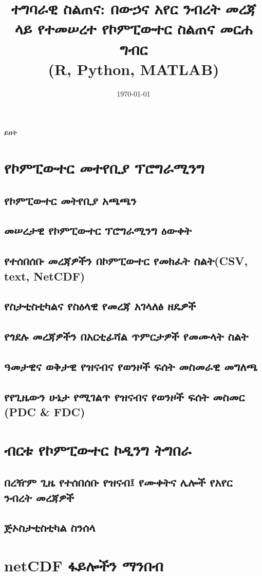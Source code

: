 \documentclass[t]{beamer}
\title[በማሞ ካሠኝ]{ተግባራዊ ስልጠና: በውኃና አየር ንብረት መረጃ ላይ የተመሠረተ የኮምፒውተር ስልጠና መርሐ ግብር \\ (R, Python, MATLAB)}
\author[በልሃ ልበልሻ የምርምር ተቋም]{በማሞ ካሠኝ \\ \url mamo.kassegn@aau.edu.et}
\date{\today}
\numberwithin{equation}{section}
\begin{document}
\titlepage 

\newpage
\begin{frame}{ይዘት}
\vspace{-6mm}
\small{
 ~~~~~~~~~~~ \tableofcontents
 } \tiny
\section{የኮምፒውተር መተየቢያ ፕሮግራሚንግ }
\subsection{የኮምፒውተር መትየቢያ አጫጫን}
\subsection{መሠረታዊ የኮምፒውተር ፕሮግራሚንግ ዕውቀት}
\subsection{የተሰበሰቡ መረጃዎችን በኮምፒውተር የመክፈት ስልት(CSV, text, NetCDF) }
\subsection{የስታቲስቲካልና የስዕላዊ የመረጃ አገላለፅ ዘዴዎች}
\subsection{የጎደሉ መረጃዎችን በአርቲፊሻል ጥምርታዎች የመሙላት ስልት}
\subsection{ዓመታዊና ወቅታዊ የዝናብና የወንዞች ፍሰት መስመራዊ መግለጫ}
\subsection{የየጊዜውን ሁኔታ የሚገልጥ የዝናብና የወንዞች ፍሰት መስመር (PDC \& FDC)}
\section{ብርቱ የኮምፒውተር ኮዲንግ ትግበራ}
\subsection{በረዥም ጊዜ የተሰበሰቡ የዝናብ፤ የሙቀትና ሌሎች የአየር ንብረት መረጃዎች}
\subsection{ጅኦስታቲስቲካል ስንሰላ }
\section{netCDF ፋይሎችን ማንበብ}

\end{frame}
\end{document}
